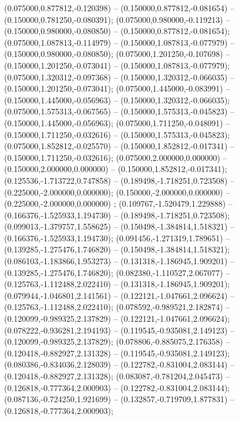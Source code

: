  (0.075000,0.877812,-0.120398) -- (0.150000,0.877812,-0.081654) -- (0.150000,0.781250,-0.080391);
 (0.075000,0.980000,-0.119213) -- (0.150000,0.980000,-0.080850) -- (0.150000,0.877812,-0.081654);
 (0.075000,1.087813,-0.114979) -- (0.150000,1.087813,-0.077979) -- (0.150000,0.980000,-0.080850);
 (0.075000,1.201250,-0.107698) -- (0.150000,1.201250,-0.073041) -- (0.150000,1.087813,-0.077979);
 (0.075000,1.320312,-0.097368) -- (0.150000,1.320312,-0.066035) -- (0.150000,1.201250,-0.073041);
 (0.075000,1.445000,-0.083991) -- (0.150000,1.445000,-0.056963) -- (0.150000,1.320312,-0.066035);
 (0.075000,1.575313,-0.067565) -- (0.150000,1.575313,-0.045823) -- (0.150000,1.445000,-0.056963);
 (0.075000,1.711250,-0.048091) -- (0.150000,1.711250,-0.032616) -- (0.150000,1.575313,-0.045823);
 (0.075000,1.852812,-0.025570) -- (0.150000,1.852812,-0.017341) -- (0.150000,1.711250,-0.032616);
 (0.075000,2.000000,0.000000) -- (0.150000,2.000000,0.000000) -- (0.150000,1.852812,-0.017341);
 (0.125536,-1.713722,0.747858) -- (0.189498,-1.718251,0.723508) -- (0.225000,-2.000000,0.000000);
 (0.150000,-2.000000,0.000000) -- (0.225000,-2.000000,0.000000) ;
 (0.109767,-1.520479,1.229888) -- (0.166376,-1.525933,1.194730) -- (0.189498,-1.718251,0.723508);
 (0.099013,-1.379757,1.558625) -- (0.150498,-1.384814,1.518321) -- (0.166376,-1.525933,1.194730);
 (0.091456,-1.271319,1.789651) -- (0.139285,-1.275476,1.746820) -- (0.150498,-1.384814,1.518321);
 (0.086103,-1.183866,1.953273) -- (0.131318,-1.186945,1.909201) -- (0.139285,-1.275476,1.746820);
 (0.082380,-1.110527,2.067077) -- (0.125763,-1.112488,2.022410) -- (0.131318,-1.186945,1.909201);
 (0.079944,-1.046801,2.141561) -- (0.122121,-1.047661,2.096624) -- (0.125763,-1.112488,2.022410);
 (0.078592,-0.989521,2.182874) -- (0.120099,-0.989325,2.137829) -- (0.122121,-1.047661,2.096624);
 (0.078222,-0.936281,2.194193) -- (0.119545,-0.935081,2.149123) -- (0.120099,-0.989325,2.137829);
 (0.078806,-0.885075,2.176358) -- (0.120418,-0.882927,2.131328) -- (0.119545,-0.935081,2.149123);
 (0.080386,-0.834036,2.128039) -- (0.122782,-0.831004,2.083144) -- (0.120418,-0.882927,2.131328);
 (0.083087,-0.781204,2.045473) -- (0.126818,-0.777364,2.000903) -- (0.122782,-0.831004,2.083144);
 (0.087136,-0.724250,1.921699) -- (0.132857,-0.719709,1.877831) -- (0.126818,-0.777364,2.000903);
